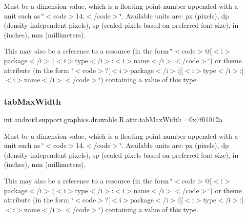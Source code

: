 Must be a dimension value, which is a floating point number appended with a unit such as \char`\"{}$<$code$>$14.\+5sp$<$/code$>$\char`\"{}. Available units are\+: px (pixels), dp (density-\/independent pixels), sp (scaled pixels based on preferred font size), in (inches), mm (millimeters). 

This may also be a reference to a resource (in the form \char`\"{}$<$code$>$@\mbox{[}$<$i$>$package$<$/i$>$\+:\mbox{]}$<$i$>$type$<$/i$>$\+:$<$i$>$name$<$/i$>$$<$/code$>$\char`\"{}) or theme attribute (in the form \char`\"{}$<$code$>$?\mbox{[}$<$i$>$package$<$/i$>$\+:\mbox{]}\mbox{[}$<$i$>$type$<$/i$>$\+:\mbox{]}$<$i$>$name$<$/i$>$$<$/code$>$\char`\"{}) containing a value of this type. \mbox{\label{classandroid_1_1support_1_1graphics_1_1drawable_1_1R_1_1attr_aa0854412018a70626e8a391429584e5c}} 
\subsubsection{\texorpdfstring{tab\+Max\+Width}{tabMaxWidth}}
{\footnotesize\ttfamily int android.\+support.\+graphics.\+drawable.\+R.\+attr.\+tab\+Max\+Width =0x7f01012a\hspace{0.3cm}{\ttfamily [static]}}

Must be a dimension value, which is a floating point number appended with a unit such as \char`\"{}$<$code$>$14.\+5sp$<$/code$>$\char`\"{}. Available units are\+: px (pixels), dp (density-\/independent pixels), sp (scaled pixels based on preferred font size), in (inches), mm (millimeters). 

This may also be a reference to a resource (in the form \char`\"{}$<$code$>$@\mbox{[}$<$i$>$package$<$/i$>$\+:\mbox{]}$<$i$>$type$<$/i$>$\+:$<$i$>$name$<$/i$>$$<$/code$>$\char`\"{}) or theme attribute (in the form \char`\"{}$<$code$>$?\mbox{[}$<$i$>$package$<$/i$>$\+:\mbox{]}\mbox{[}$<$i$>$type$<$/i$>$\+:\mbox{]}$<$i$>$name$<$/i$>$$<$/code$>$\char`\"{}) containing a value of this type. \mbox{\label{classandroid_1_1support_1_1graphics_1_1drawable_1_1R_1_1attr_a36e5d7d56e7c107071e1f01fa7598843}} 
